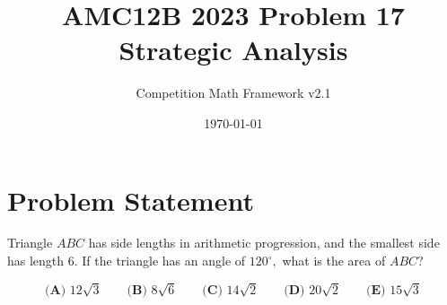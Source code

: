 \documentclass[12pt]{article}
\begin{document}
\title{AMC12B 2023 Problem 17\\Strategic Analysis}
\author{Competition Math Framework v2.1}
\date{\today}
\maketitle

\section*{Problem Statement}

Triangle $ABC$ has side lengths in arithmetic progression, and the smallest side has length $6.$ If the triangle has an angle of $120^\circ,$ what is the area of $ABC$?

$$\textbf{(A) } 12\sqrt{3} \qquad \textbf{(B) } 8\sqrt{6} \qquad \textbf{(C) } 14\sqrt{2} \qquad \textbf{(D) } 20\sqrt{2} \qquad \textbf{(E) } 15\sqrt{3}$$
\end{document}
